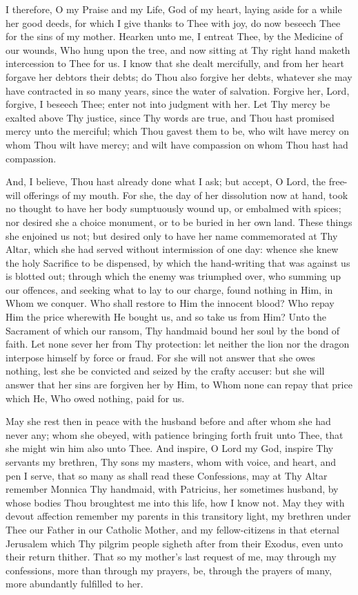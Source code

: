 \documentclass[b5paper,openright,12pt,twoside]{book}
\begin{document}
I therefore, O my Praise and my Life, God of my heart, laying aside for
a while her good deeds, for which I give thanks to Thee with joy, do now
beseech Thee for the sins of my mother. Hearken unto me, I entreat Thee,
by the Medicine of our wounds, Who hung upon the tree, and now sitting
at Thy right hand maketh intercession to Thee for us. I know that she
dealt mercifully, and from her heart forgave her debtors their debts; do
Thou also forgive her debts, whatever she may have contracted in so
many years, since the water of salvation. Forgive her, Lord, forgive, I
beseech Thee; enter not into judgment with her. Let Thy mercy be exalted
above Thy justice, since Thy words are true, and Thou hast promised
mercy unto the merciful; which Thou gavest them to be, who wilt have
mercy on whom Thou wilt have mercy; and wilt have compassion on whom
Thou hast had compassion.

And, I believe, Thou hast already done what I ask; but accept, O Lord,
the free-will offerings of my mouth. For she, the day of her dissolution
now at hand, took no thought to have her body sumptuously wound up, or
embalmed with spices; nor desired she a choice monument, or to be buried
in her own land. These things she enjoined us not; but desired only to
have her name commemorated at Thy Altar, which she had served without
intermission of one day: whence she knew the holy Sacrifice to be
dispensed, by which the hand-writing that was against us is blotted out;
through which the enemy was triumphed over, who summing up our offences,
and seeking what to lay to our charge, found nothing in Him, in Whom we
conquer. Who shall restore to Him the innocent blood? Who repay Him
the price wherewith He bought us, and so take us from Him? Unto the
Sacrament of which our ransom, Thy handmaid bound her soul by the bond
of faith. Let none sever her from Thy protection: let neither the lion
nor the dragon interpose himself by force or fraud. For she will not
answer that she owes nothing, lest she be convicted and seized by the
crafty accuser: but she will answer that her sins are forgiven her by
Him, to Whom none can repay that price which He, Who owed nothing, paid
for us.

May she rest then in peace with the husband before and after whom she
had never any; whom she obeyed, with patience bringing forth fruit unto
Thee, that she might win him also unto Thee. And inspire, O Lord my God,
inspire Thy servants my brethren, Thy sons my masters, whom with
voice, and heart, and pen I serve, that so many as shall read these
Confessions, may at Thy Altar remember Monnica Thy handmaid, with
Patricius, her sometimes husband, by whose bodies Thou broughtest me
into this life, how I know not. May they with devout affection remember
my parents in this transitory light, my brethren under Thee our Father
in our Catholic Mother, and my fellow-citizens in that eternal Jerusalem
which Thy pilgrim people sigheth after from their Exodus, even unto
their return thither. That so my mother's last request of me, may
through my confessions, more than through my prayers, be, through the
prayers of many, more abundantly fulfilled to her.
\end{document}
